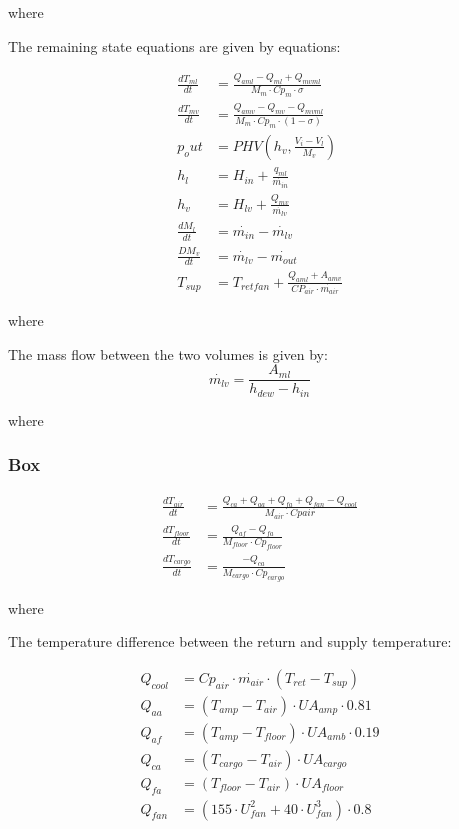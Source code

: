 where

The remaining state equations are given by equations:

\begin{align}
	\frac{dT_{ml}}{dt} & = \frac{Q_{aml}-Q_{ml} + Q_{mvml}}{M_m \cdot Cp_m \cdot \sigma} \\
	\frac{dT_{mv}}{dt} & = \frac{Q_{amv} - Q_{mv} - Q_{mvml}}{M_m \cdot Cp_m \cdot (1- \sigma)} \\
	p_out & = PHV \left( h_v, \frac{V_i-V_l}{M_v} \right)\\
	h_l & = H_{in} + \frac{q_{ml}}{\dot{m_{in}}}\\
	h_v & = H_{lv} + \frac{Q_{mv}}{\dot{m_{lv}}}\\
	\frac{dM_l}{dt} & = \dot{m_{in}} - \dot{m_{lv}}\\
	\frac{DM_v}{dt} & = \dot{m_{lv}} - \dot{m_{out}}\\
	T_{sup} & = T_{retfan} +  \frac{Q_{aml} + A_{amv}}{CP_{air} \cdot \dot{m_{air}}}
\end{align}

where

The mass flow between the two volumes is given by:
\begin{equation}
	\dot{m_{lv}} = \frac{A_{ml}}{h_{dew} - h_{in}}
\end{equation}

where

\subsubsection{Box}

\begin{align}
	\frac{dT_{air}}{dt} & = \frac{Q_{ca} + Q_{aa} + Q_{fa} + Q_{fan} -Q_{cool}}{M_{air} \cdot Cp{air}} \\
	\frac{dT_{floor}}{dt} & = \frac{Q_{af} - Q_{fa}}{M_{floor} \cdot Cp_{floor}} \\
	\frac{dT_{cargo}}{dt} & = \frac{-Q_{ca}}{M_{cargo} \cdot Cp_{cargo}}
\end{align}

where

The temperature difference between the return and supply temperature:

\begin{align}
	Q_{cool} & = Cp_{air} \cdot \dot{m_{air}} \cdot (T_{ret} - T_{sup})\\
	Q_{aa} & = (T_{amp} - T_{air}) \cdot U A_{amp} \cdot 0.81\\
	Q_{af} & = (T_{amp} - T_{floor}) \cdot U A_{amb} \cdot 0.19\\
	Q_{ca} & = (T_{cargo} - T_{air}) \cdot U A_{cargo}\\
	Q_{fa} & = (T_{floor} - T_{air}) \cdot U A_{floor}\\
	Q_{fan} & = (155 \cdot U_{fan}^2 + 40 \cdot U_{fan}^3) \cdot 0.8
\end{align}


